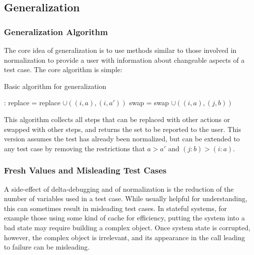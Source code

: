 \subsection{Generalization}

\subsubsection{Generalization Algorithm}

The core idea of generalization is to use methods similar to those
involved in normalization to provide a user with information about
changeable aspects of a test case.  The core algorithm is simple:

\begin{algorithm}
\caption{Basic algorithm for generalization}
\label{genalg}
\begin{algorithmic}[1]
:
\State replace = replace $\cup ((i,a),(i,a'))$
\EndIf
\EndFor 
{}
\State swap = swap $\cup ((i,a),(j,b))$
\EndIf
\EndFor
\EndFor
{}
\end{algorithmic}
\end{algorithm}

This algorithm collects all steps that can be replaced with other
actions or swapped with other steps, and returns the set to be
reported to the user.  This version assumes the test has already been
normalized, but can be extended to any test case by removing the
restrictions that $a > a'$ and $(j : b) > (i : a)$.

\subsubsection{Fresh Values and Misleading Test Cases}

A side-effect of delta-debugging and of normalization is the reduction
of the number of variables used in a test case.  While usually helpful
for understanding, this can sometimes result in misleading test
cases.  In stateful systems, for example those using some kind of
cache for efficiency, putting the system into a bad state may require
building a complex object.  Once system state is corrupted, however,
the complex object is irrelevant, and its appearance in the call
leading to failure can be misleading.

